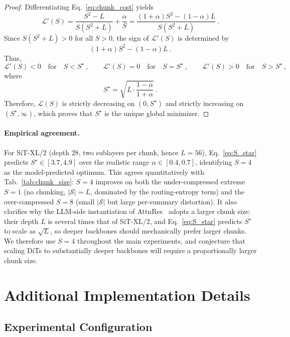\documentclass[]{ant_tech_report}
\begin{document}
\begin{proof}
Differentiating Eq.~\eqref{eq:chunk_cost} yields
\[
\mathcal{L}'(S)
=
\frac{S^2 - L}{S(S^2 + L)}
+
\frac{\alpha}{S}
=
\frac{(1+\alpha)S^2-(1-\alpha)L}{S(S^2+L)} \ .
\]
Since $S(S^2+L)>0$ for all $S>0$, the sign of $\mathcal{L}'(S)$ is determined by
\[
(1+\alpha)S^2-(1-\alpha)L \ .
\]
Thus,
\[
\mathcal{L}'(S)<0 \quad \text{for} \quad S<S^\star \ ,
\qquad
\mathcal{L}'(S)=0 \quad \text{for} \quad S=S^\star \ ,
\qquad
\mathcal{L}'(S)>0 \quad \text{for} \quad S>S^\star \ ,
\]
where
\[
S^\star=\sqrt{L \cdot \frac{1-\alpha}{1+\alpha}} \ .
\]
Therefore, $\mathcal{L}(S)$ is strictly decreasing on $(0,S^\star)$ and strictly
increasing on $(S^\star,\infty)$, which proves that $S^\star$ is the unique
global minimizer.
\end{proof}

\paragraph{Empirical agreement.}
For SiT-XL/2 (depth $28$, two sublayers per chunk, hence $L = 56$), Eq.~\eqref{eq:S_star} predicts $S^\star \in [3.7, 4.9]$ over the realistic range $\alpha \in [0.4, 0.7]$, identifying $S = 4$ as the model-predicted optimum. This agrees quantitatively with Tab.~\ref{tab:chunk_size}: $S = 4$ improves on both the under-compressed extreme $S = 1$ (no chunking, $|\mathcal{S}| = L$, dominated by the routing-entropy term) and the over-compressed $S = 8$ (small $|\mathcal{S}|$ but large per-summary distortion). It also clarifies why the LLM-side instantiation of AttnRes~\citep{team2026attention} adopts a larger chunk size: their depth $L$ is several times that of SiT-XL/2, and Eq.~\eqref{eq:S_star} predicts $S^\star$ to scale as $\sqrt{L}$, so deeper backbones should mechanically prefer larger chunks. We therefore use $S = 4$ throughout the main experiments, and conjecture that scaling DiTs to substantially deeper backbones will require a proportionally larger chunk size.


\section{Additional Implementation Details}
\label{impl}

\subsection{Experimental Configuration}
\end{document}
